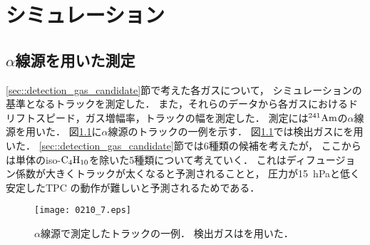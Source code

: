 \documentclass[../master]{subfiles}
\begin{document}
\chapter{シミュレーション}
\label{chap::simulation}
\section{$\alpha$線源を用いた測定}
\ref{sec::detection_gas_candidate}節で考えた各ガスについて，
シミュレーションの基準となるトラックを測定した．
また，それらのデータから各ガスにおけるドリフトスピード，ガス増幅率，トラックの幅を測定した．
測定には${}^{241}{\rm Am}$の$\alpha$線源を用いた．
図\ref{fig::a_source_track}に$\alpha$線源のトラックの一例を示す．
図\ref{fig::a_source_track}では検出ガスに\isoButaneHydro を用いた．
\ref{sec::detection_gas_candidate}節では6種類の候補を考えたが，
ここからは単体のiso-$\rm C_{4}H_{10}$を除いた5種類について考えていく．
これはディフュージョン係数が大きくトラックが太くなると予測されることと，
圧力が\SI{15}{\hecto\pascal}と低く安定したTPC の動作が難しいと予測されるためである．
\begin{figure}
  \centering
  \texttt{[image: 0210\_7.eps]}
  \caption[$\alpha$線源で測定したトラックの一例．]
          {$\alpha$線源で測定したトラックの一例．
          検出ガスは\isoButaneHydro を用いた．}
  \label{fig::a_source_track}
\end{figure}
\end{document}
